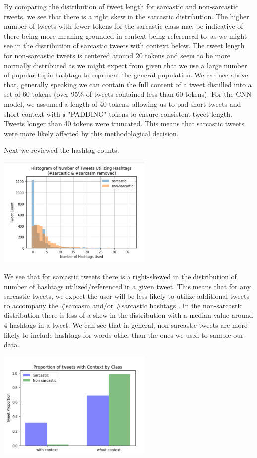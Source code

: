 \documentclass[11pt,a4paper]{article}
\begin{document}
By comparing the distribution of tweet length for sarcastic and non-sarcastic tweets, we see that there is a right skew in the sarcastic distribution. The higher number of tweets with fewer tokens for the sarcastic class may be indicative of there being more meaning grounded in context being referenced to--as we might see in the distribution of sarcastic tweets with context below. The tweet length for non-sarcastic tweets is centered around 20 tokens and seem to be more normally distributed as we might expect from given that we use a large number of popular topic hashtags to represent the general population. We can see above that, generally speaking we can contain the full content of a tweet distilled into a set of 60 tokens (over 95\% of tweets contained less than 60 tokens). For the CNN model, we assumed a length of 40 tokens, allowing us to pad short tweets and short context with a "PADDING" tokens to ensure consistent tweet length. Tweets longer than 40 tokens were truncated. This means that sarcastic tweets were more likely affected by this methodological decision.

Next we reviewed the hashtag counts. 

\includegraphics[width=75mm,scale=0.5]{hashtag_histogram.png}

We see that for sarcastic tweets there is a right-skewed in the distribution of number of hashtags utilized/referenced in a given tweet. This means that for any sarcastic tweets, we expect the user will be less likely to utilize additional tweets to accompany the \#sarcasm and/or \#sarcastic hashtags . In the non-sarcastic distribution there is less of a skew in the distribution with a median value around 4 hashtags in a tweet. We can see that in general, non sarcastic tweets are more likely to include hashtags for words other than the ones we used to sample our data. 

\includegraphics[width=75mm,scale=0.5]{context_proportion.png}
\end{document}
